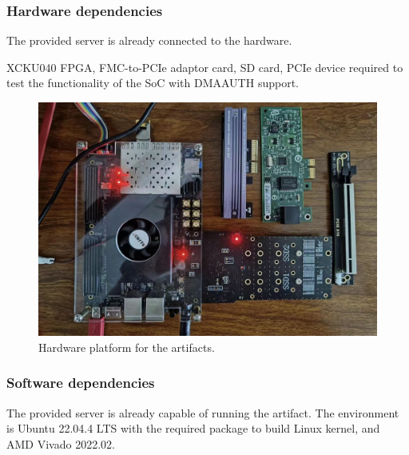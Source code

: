 \subsubsection{Hardware dependencies}

The provided server is already connected to the hardware.

XCKU040 FPGA, FMC-to-PCIe adaptor card, SD card, PCIe device required to test the functionality of the SoC with DMAAUTH support.

\begin{figure}[!h]
    \includegraphics[width=\linewidth]{figures/platform.jpg}
    \caption{Hardware platform for the artifacts.}
\end{figure}


\subsubsection{Software dependencies}
The provided server is already capable of running the artifact. The environment is Ubuntu 22.04.4 LTS with the required package to build Linux kernel, and AMD Vivado 2022.02.

